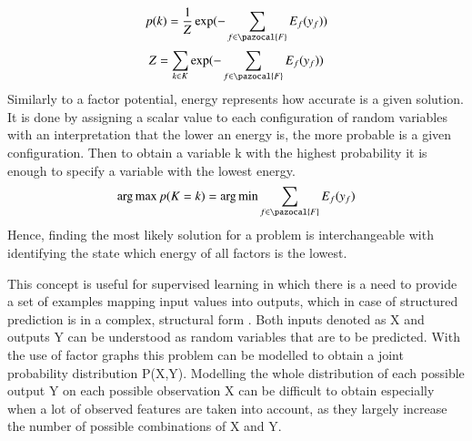 \begin{equation}
    p(k)=\frac{1}{Z}\exp(-\sum_{f\in \pazocal{F}}{E_f}({y_f})) 
\end{equation}
\begin{equation}
    Z=\sum_{k\in K}\exp(-\sum_{f\in \pazocal{F}}{E_f}({y_f}))
\end{equation}
Similarly to a factor potential, energy \cite{factor_graphs_chopra} represents how accurate is a given solution. It is done by assigning a scalar value to each configuration of random variables with an interpretation that the lower an energy is, the more probable is a given configuration.  Then to obtain a variable k with the highest probability it is enough to specify a variable with the lowest energy.
\begin{equation}
    \argmax p(K=k) = \argmin \sum_{f\in \pazocal{F}} {E_f}({y_f})
\end{equation}
Hence, finding the most likely solution for a problem is interchangeable with identifying the state which energy of all factors is the lowest. 

This concept is useful for supervised learning in which there is a need to provide a set of examples mapping input values into outputs, which in case of structured prediction is in a complex, structural form \cite{crf_sutton}. Both inputs denoted as X and outputs Y can be understood as random variables that are to be predicted. With the use of factor graphs this problem can be modelled to obtain a joint probability distribution P(X,Y). Modelling the whole distribution of each possible output Y on each possible observation X can be difficult to obtain especially when a lot of observed features are taken into account, as they largely increase the number of possible combinations of X and Y.
